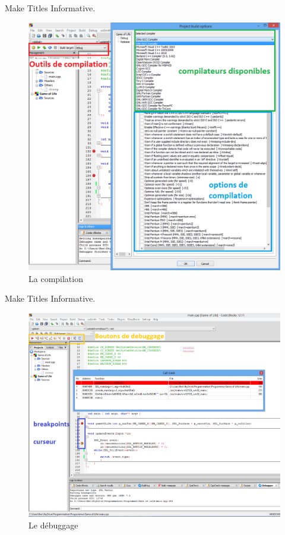 \documentclass{beamer}
\begin{document}
\begin{frame}{Make Titles Informative.}
\begin{figure}
\includegraphics[scale=0.6]{../images/cb06.png}
\caption{La compilation}				
\label{cb06}				
\end{figure}
\end{frame}

\begin{frame}{Make Titles Informative.}
\begin{figure}
\includegraphics[scale=0.5]{../images/cb07.png}
\caption{Le débuggage}				
\label{cb07}				
\end{figure}
\end{frame}
\end{document}
